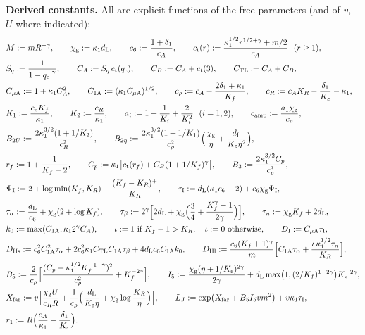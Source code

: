 \noindent\textbf{Derived constants.} All are explicit functions of the free parameters (and of $v$, $U$ where indicated):
\begingroup\allowdisplaybreaks
\begin{align*}
&M:=mR^{-\gamma},\qquad \ESchi:=\kappa_1\ESd,\qquad c_6:=\frac{1+\delta_1}{c_A},\qquad
\ESct(r):=\frac{\kappa_1^{1/2}r^{1/2+\gamma}+m/2}{c_A}\ \ (r\ge1),\\
&S_q:=\frac1{1-\ESq^{-\gamma}},\qquad C_A:=S_q\,\ESct(\ESq),\qquad C_B:=C_A+\ESct(3),\qquad \ETL:=C_A+C_B,\\
&\ESCmu:=1+\kappa_1C_A^2,\qquad \ESCone:=(\kappa_1\ESCmu)^{1/2},\qquad
c_\rho:=c_A-\frac{2\delta_1+\kappa_1}{K_f},\qquad c_R:=c_AK_R-\frac{\delta_1}{K_\varepsilon}-\kappa_1,\\
&K_1:=\frac{c_\rho K_f}{\kappa_1},\qquad K_2:=\frac{c_R}{\kappa_1},\qquad a_i:=1+\frac1{K_i}+\frac2{K_i^2}\ \ (i=1,2),\qquad
\EScamp:=\frac{a_1\ESchi}{c_\rho},\\
&B_{2U}:=\frac{2\kappa_1^{3/2}(1+1/K_2)}{c_R^2},\qquad
B_{2\eta}:=\frac{2\kappa_1^{3/2}(1+1/K_1)}{c_\rho^2}\Bigl(\frac{\ESchi}\eta+\frac{\ESd}{K_\varepsilon\eta^2}\Bigr),\\
&r_f:=1+\frac1{K_f-2},\qquad C_p:=\kappa_1\bigl[\ESct(r_f)+C_B(1+1/K_f)^\gamma\bigr],\qquad B_3:=\frac{2\kappa_1^{3/2}C_p}{c_\rho^3},\\
&\ESPsi:=2+\log\min(K_f,K_R)+\frac{(K_f-K_R)^+}{K_R},\qquad \tau_{\mathrm I}:=\ESd(\kappa_1c_6+2)+c_6\ESchi\ESPsi,\\
&\tau_\alpha:=\frac{\ESd}{c_6}+\ESchi(2+\log K_f),\qquad
\tau_\beta:=2^\gamma\Bigl[2\ESd+\ESchi\Bigl(\frac34+\frac{K_f^\gamma-1}{2\gamma}\Bigr)\Bigr],\qquad
\tau_n:=\ESchi K_f+2\ESd,\\
&k_0:=\max(\ESCone,\kappa_12^\gamma C_A),\qquad
\iota:=1\ \text{if }K_f+1>K_R,\quad\iota:=0\ \text{otherwise},\qquad \ESDI:=\ESCmu\tau_{\mathrm I},\\
&\ESDs:=c_6^2\ESCone^2\tau_\alpha+2c_6^2\kappa_1\ETL\ESCone\tau_\beta+4\ESd c_6\ESCone k_0,\qquad
\ESDl:=\frac{c_6(K_f+1)^\gamma}m\Bigl[\ESCone\tau_\alpha+\frac{\iota\,\kappa_1^{1/2}\tau_n}{K_R}\Bigr],\\
&B_5:=\frac2{c_\rho}\Bigl[\frac{(C_p+\kappa_1^{1/2}K_f^{-1-\gamma})^2}{c_\rho^2}+K_f^{-2\gamma}\Bigr],\qquad
I_5:=\frac{\ESchi(\eta+1/K_\varepsilon)^{2\gamma}}{2\gamma}+\ESd\max\bigl(1,(2/K_f)^{1-2\gamma}\bigr)K_\varepsilon^{-2\gamma},\\
&\ESX:=v\Bigl[\frac{\ESchi U}{c_RR}+\frac1{c_\rho}\Bigl(\frac{\ESd}{K_\varepsilon\eta}+\ESchi\log\frac{K_R}\eta\Bigr)\Bigr],\qquad
L_J:=\exp\bigl(\ESX+B_5I_5vm^2\bigr)+v\kappa_1\tau_{\mathrm I},\\
&r_1:=R\Bigl(\frac{c_A}{\kappa_1}-\frac{\delta_1}{K_\varepsilon}\Bigr).
\end{align*}
\endgroup

